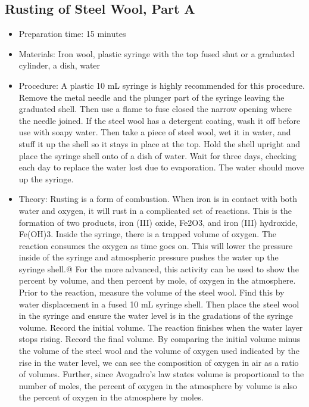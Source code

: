 \subsection{Rusting of Steel Wool, Part A}
\begin{itemize}
\item{Preparation time: 15 minutes}
\item{Materials: Iron wool, plastic syringe with the top fused shut or a graduated cylinder, a dish, water}
\item{Procedure: A plastic 10 mL syringe is highly recommended for this procedure. Remove the metal needle and the plunger part of the syringe leaving the graduated shell. Then use a flame to fuse closed the narrow opening where the needle joined. If the steel wool has a detergent coating, wash it off before use with soapy water. Then take a piece of steel wool, wet it in water, and stuff it up the shell so it stays in place at the top. Hold the shell upright and place the syringe shell onto of a dish of water. Wait for three days, checking each day to replace the water lost due to evaporation. The water should move up the syringe.}
\item{Theory: Rusting is a form of combustion. When iron is in contact with both water and oxygen, it will rust in a complicated set of reactions. This is the formation of two products, iron (III) oxide, Fe2O3, and iron (III) hydroxide, Fe(OH)3. Inside the syringe, there is a trapped volume of oxygen. The reaction consumes the oxygen as time goes on. This will lower the pressure inside of the syringe and atmospheric pressure pushes the water up the syringe shell.@	For the more advanced, this activity can be used to show the percent by volume, and then percent by mole, of oxygen in the atmosphere. Prior to the reaction, measure the volume of the steel wool. Find this by water displacement in a fused 10 mL syringe shell. Then place the steel wool in the syringe and ensure the water level is in the gradations of the syringe volume. Record the initial volume. The reaction finishes when the water layer stops rising. Record the final volume. By comparing the initial volume minus the volume of the steel wool and the volume of oxygen used indicated by the rise in the water level, we can see the composition of oxygen in air as a ratio of volumes. Further, since Avogadro’s law states volume is proportional to the number of moles, the percent of oxygen in the atmosphere by volume is also the percent of oxygen in the atmosphere by moles. }
\end{itemize}


